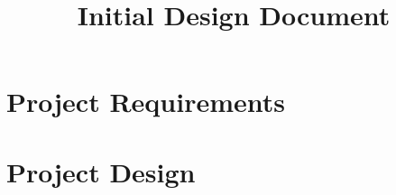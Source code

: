 \documentclass{book}
\title{\ProjectName{} \\ Initial Design Document}
\author{\DocumentAuthor}
\date{\vhCurrentDate}
\begin{document}
\maketitle

\frontmatter



\cleardoublepage{}
\tableofcontents

\mainmatter{}
\part{Project Requirements}\label{part:requirements}





\part{Project Design}%













\appendix{}


\cleardoublepage{}
\printindex

\cleardoublepage{}
\end{document}
